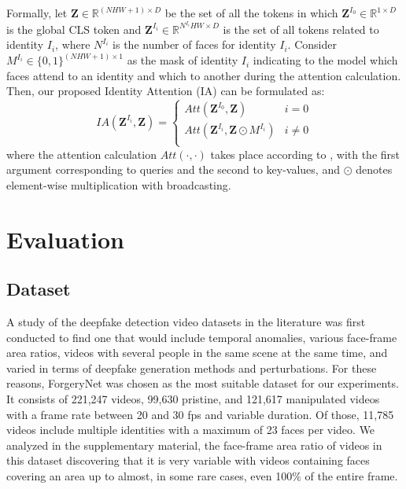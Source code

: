 \documentclass[10pt,twocolumn,letterpaper]{article}
\begin{document}
Formally, let $\textbf{Z} \in \mathbb{R}^{(NHW+1) \times D}$ be the set of all the tokens in which $\textbf{Z}^{I_0} \in \mathbb{R}^{1 \times D}$ is the global CLS token and $\textbf{Z}^{I_i} \in \mathbb{R}^{N^{I_i}HW \times D}$ is the set of all tokens related to identity $I_i$, where $N^{I_i}$ is the number of faces for identity $I_i$. Consider $M^{I_i} \in \{0,1\}^{(NHW+1) \times 1}$ as the mask of identity $I_i$ indicating to the model which faces attend to an identity and which to another during the attention calculation.
Then, our proposed Identity Attention (IA) can be formulated as: \begin{equation}\label{eq:identityattention}
    IA(\textbf{Z}^{I_i}, \textbf{Z}) =
    \begin{cases}
        Att(\textbf{Z}^{I_0}, \textbf{Z})  &  i=0 \\
        Att(\textbf{Z}^{I_i}, \textbf{Z} \odot M^{I_i})  &  i\neq0 \\
    \end{cases}
\end{equation}
where the attention calculation $Att(\cdot, \cdot)$
takes place according to \cite{Bertasius2021IsSA}, 
with the first argument corresponding to queries and the second to key-values, and $\odot$ denotes element-wise multiplication with broadcasting. 


\section{Evaluation}
\subsection{Dataset}


A study of the deepfake detection video datasets in the literature was first conducted to find one that would include temporal anomalies, various face-frame area ratios, videos with several people in the same scene at the same time, and varied in terms of deepfake generation methods and perturbations.  
For these reasons, ForgeryNet\cite{forgerynet} was chosen as the most suitable dataset for our experiments. It consists of 221,247 videos, 99,630 pristine, and 121,617 manipulated videos with a frame rate between 20 and 30 fps and variable duration. Of those, 11,785 videos include multiple identities with a maximum of 23 faces per video. We analyzed in the supplementary material, the face-frame area ratio of videos in this dataset discovering that it is very variable with videos containing faces covering an area up to almost, in some rare cases, even 100\% of the entire frame.
\end{document}
